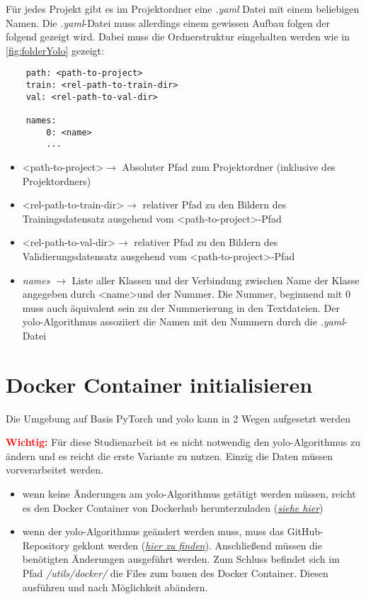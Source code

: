 Für jedes Projekt gibt es im Projektordner eine \textit{.yaml} Datei mit einem beliebigen Namen. Die \textit{.yaml}-Datei muss allerdings einem gewissen Aufbau folgen der folgend gezeigt wird. Dabei muss die Ordnerstruktur eingehalten werden wie in \autoref{fig:folderYolo} gezeigt:
\begin{verbatim}
    path: <path-to-project>
    train: <rel-path-to-train-dir>
    val: <rel-path-to-val-dir>

    names:
        0: <name>
        ...
\end{verbatim}
\begin{itemize}
\item \textless path-to-project\textgreater  $\rightarrow$ Absoluter Pfad zum Projektordner (inklusive des Projektordners)
\item \textless rel-path-to-train-dir\textgreater  $\rightarrow$ relativer Pfad zu den Bildern des Trainingsdatensatz ausgehend vom \textless path-to-project\textgreater-Pfad
\item \textless rel-path-to-val-dir\textgreater  $\rightarrow$ relativer Pfad zu den Bildern des Validierungsdatensatz ausgehend vom \textless path-to-project\textgreater-Pfad
\item \textit{names} $\rightarrow$ Liste aller Klassen und der Verbindung zwischen Name der Klasse angegeben durch \textless name\textgreater  und der Nummer. Die Nummer, beginnend mit 0 muss auch äquivalent sein zu der Nummerierung in den Textdateien. Der \ac{yolo}-Algorithmus assoziiert die Namen mit den Nummern durch die \textit{.yaml}-Datei
\end{itemize}

\section{Docker Container initialisieren}

Die Umgebung auf Basis PyTorch und \ac{yolo} kann in 2 Wegen aufgesetzt werden

\textcolor{red}{\textbf{Wichtig:}} Für diese Studienarbeit ist es nicht notwendig den \ac{yolo}-Algorithmus zu ändern und es reicht die erste Variante zu nutzen. Einzig die Daten müssen vorverarbeitet werden.

\begin{itemize}
    \item wenn keine Änderungen am \ac{yolo}-Algorithmus getätigt werden müssen, reicht es den Docker Container von Dockerhub herunterzuladen (\textit{\href{https://hub.docker.com/r/ultralytics/yolov5}{siehe hier}})
    \item wenn der \ac{yolo}-Algorithmus geändert werden muss, muss das GitHub-Repository geklont werden (\textit{\href{https://github.com/ultralytics/yolov5}{hier zu finden}}). Anschließend müssen die benötigten Änderungen ausgeführt werden. Zum Schluss befindet sich im Pfad \textit{/utils/docker/} die Files zum bauen des Docker Container. Diesen ausführen und nach Möglichkeit abändern.
\end{itemize}